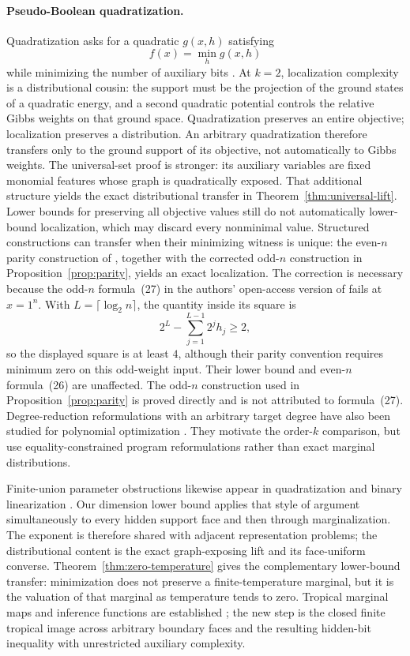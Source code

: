 \documentclass{article}
\begin{document}
\paragraph{Pseudo-Boolean quadratization.}
Quadratization asks for a quadratic $g(x,h)$ satisfying
\[
  f(x)=\min_h g(x,h)
\]
while minimizing the number of auxiliary bits
\cite{anthony17}.  At $k=2$, localization complexity is a distributional cousin:
the support must be the projection of the ground states of a quadratic energy,
and a second quadratic potential controls the relative Gibbs weights on that
ground space.  Quadratization preserves an entire objective; localization
preserves a distribution.  An arbitrary quadratization therefore transfers
only to the ground support of its objective, not automatically to Gibbs
weights.  The universal-set proof is stronger: its auxiliary variables are
fixed monomial features whose graph is quadratically exposed.  That additional
structure yields the exact distributional transfer in
Theorem~\ref{thm:universal-lift}.  Lower bounds for preserving all objective
values still do not automatically lower-bound localization, which may discard
every nonminimal value.  Structured constructions can transfer when their
minimizing witness is unique: the even-$n$ parity construction of
\cite{bcrh20}, together with the corrected odd-$n$ construction in
Proposition~\ref{prop:parity}, yields an exact localization.  The correction is
necessary because the odd-$n$ formula~(27) in the authors' open-access version
of \cite[Theorem~11]{bcrh20} fails at $x=1^n$.  With
$L=\lceil\log_2 n\rceil$, the quantity inside its square is
\[
  2^L-\sum_{j=1}^{L-1}2^j h_j\ge2,
\]
so the displayed square is at least $4$, although their parity convention
requires minimum zero on this odd-weight input.  Their lower bound and
even-$n$ formula~(26) are unaffected.  The odd-$n$ construction used in
Proposition~\ref{prop:parity} is proved directly and is not attributed to
formula~(27).
Degree-reduction reformulations with an arbitrary target degree have also been
studied for polynomial optimization \cite{gonzalez25}.  They motivate the
order-$k$ comparison, but use equality-constrained program reformulations
rather than exact marginal distributions.

Finite-union parameter obstructions likewise appear in quadratization
\cite[Theorem~1]{anthony17} and binary linearization
\cite[Theorem~6 and Corollary~7]{walter24}.  Our dimension lower bound applies
that style of argument simultaneously to every hidden support face and then
through marginalization.  The exponent is therefore shared with adjacent
representation problems; the distributional content is the exact
graph-exposing lift and its face-uniform converse.
Theorem~\ref{thm:zero-temperature} gives the complementary lower-bound
transfer: minimization does not preserve a finite-temperature marginal, but it
is the valuation of that marginal as temperature tends to zero.  Tropical
marginal maps and inference functions are established
\cite{pachtersturmfels04,cuetomortonsturmfels10,montufarmorton17}; the new step
is the closed finite tropical image across arbitrary boundary faces and the
resulting hidden-bit inequality with unrestricted auxiliary complexity.
\end{document}

